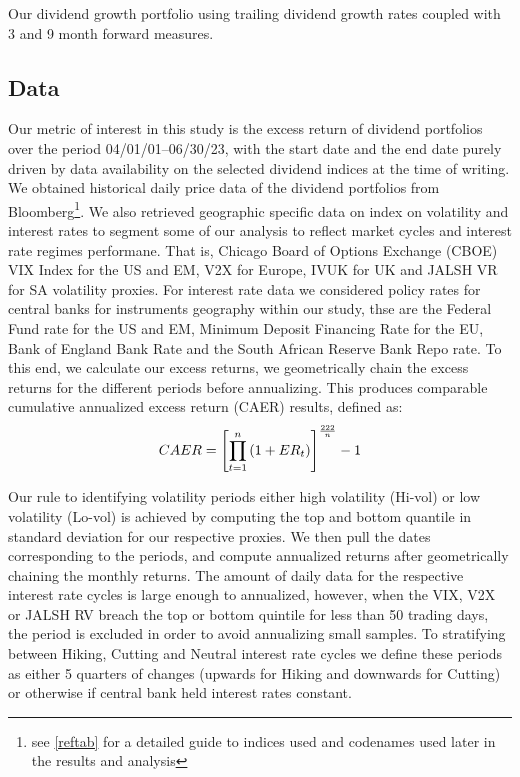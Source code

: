 \documentclass[12pt,preprint, authoryear]{elsarticle}
\numberwithin{equation}{section}
\numberwithin{figure}{section}
\numberwithin{table}{section}
\let\rmarkdownfootnote\footnote%
\def\footnote{\protect\rmarkdownfootnote}
\begin{document}
Our dividend growth portfolio using trailing dividend growth rates
coupled with 3 and 9 month forward measures.

\newpage

\hypertarget{data}{%
\subsection{Data}\label{data}}

Our metric of interest in this study is the excess return of dividend
portfolios over the period 04/01/01--06/30/23, with the start date and
the end date purely driven by data availability on the selected dividend
indices at the time of writing. We obtained historical daily price data
of the dividend portfolios from Bloomberg\footnote{see \ref{reftab} for
  a detailed guide to indices used and codenames used later in the
  results and analysis}. We also retrieved geographic specific data on
index on volatility and interest rates to segment some of our analysis
to reflect market cycles and interest rate regimes performane. That is,
Chicago Board of Options Exchange (CBOE) VIX Index for the US and EM,
V2X for Europe, IVUK for UK and JALSH VR for SA volatility proxies. For
interest rate data we considered policy rates for central banks for
instruments geography within our study, thse are the Federal Fund rate
for the US and EM, Minimum Deposit Financing Rate for the EU, Bank of
England Bank Rate and the South African Reserve Bank Repo rate. To this
end, we calculate our excess returns, we geometrically chain the excess
returns for the different periods before annualizing. This produces
comparable cumulative annualized excess return (CAER) results, defined
as: \begin{align}
C A E R=\left[\prod_{t=1}^n\left(1+E R_t\right)\right]^{\frac{222}{n}}-1 \notag
\end{align}

Our rule to identifying volatility periods either high volatility
(Hi-vol) or low volatility (Lo-vol) is achieved by computing the top and
bottom quantile in standard deviation for our respective proxies. We
then pull the dates corresponding to the periods, and compute annualized
returns after geometrically chaining the monthly returns. The amount of
daily data for the respective interest rate cycles is large enough to
annualized, however, when the VIX, V2X or JALSH RV breach the top or
bottom quintile for less than 50 trading days, the period is excluded in
order to avoid annualizing small samples. To stratifying between Hiking,
Cutting and Neutral interest rate cycles we define these periods as
either 5 quarters of changes (upwards for Hiking and downwards for
Cutting) or otherwise if central bank held interest rates constant.
\end{document}
